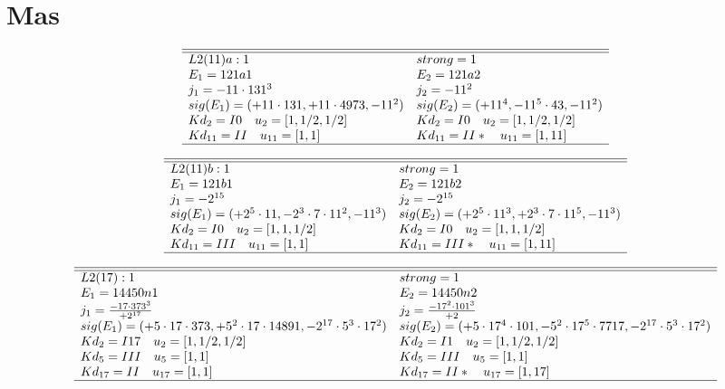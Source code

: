 \documentclass[11pt]{article}
\theoremstyle{definition}
\begin{document}
\newpage 

\section{Mas}
$$
 \begin{array}{ll}
 \hline 
\hline 
  L2(11)a:1  & strong=1\\
 E_1=121a1 & E_2=121a2 \\
 j_1=-11\cdot 131^{3} & j_2=-11^{2} \\
 sig(E_1)=(+11\cdot 131,+11\cdot 4973,-11^{2}) & sig(E_2)=(+11^{4},-11^{5}\cdot 43,-11^{2}) \\
  Kd_{2}=I0\quad u_{2}=[ 1, 1/2, 1/2 ]&  Kd_{2}=I0\quad u_{2}=[ 1, 1/2, 1/2 ]\\
  Kd_{11}=II\quad u_{11}=[ 1, 1 ]&  Kd_{11}=II*\quad u_{11}=[ 1, 11 ]\\
\hline
\end{array}
 $$


$$
 \begin{array}{ll}
 \hline 
\hline 
  L2(11)b:1  & strong=1\\
 E_1=121b1 & E_2=121b2 \\
 j_1=-2^{15} & j_2=-2^{15} \\
 sig(E_1)=(+2^{5}\cdot 11,-2^{3}\cdot 7\cdot 11^{2},-11^{3}) & sig(E_2)=(+2^{5}\cdot 11^{3},+2^{3}\cdot 7\cdot 11^{5},-11^{3}) \\
  Kd_{2}=I0\quad u_{2}=[ 1, 1, 1/2 ]&  Kd_{2}=I0\quad u_{2}=[ 1, 1, 1/2 ]\\
  Kd_{11}=III\quad u_{11}=[ 1, 1 ]&  Kd_{11}=III*\quad u_{11}=[ 1, 11 ]\\
\hline
\end{array}
 $$


$$
 \begin{array}{ll}
 \hline 
\hline 
  L2(17):1  & strong=1\\
 E_1=14450n1 & E_2=14450n2 \\
 j_1=\frac{-17\cdot 373^{3}}{+2^{17}} & j_2=\frac{-17^{2}\cdot 101^{3}}{+2} \\
 sig(E_1)=(+5\cdot 17\cdot 373,+5^{2}\cdot 17\cdot 14891,-2^{17}\cdot 5^{3}\cdot
17^{2}) & sig(E_2)=(+5\cdot 17^{4}\cdot 101,-5^{2}\cdot 17^{5}\cdot 7717,-2^{17}\cdot 
5^{3}\cdot 17^{2}) \\
  Kd_{2}=I17\quad u_{2}=[ 1, 1/2, 1/2 ]&  Kd_{2}=I1\quad u_{2}=[ 1, 1/2, 1/2 ]\\
  Kd_{5}=III\quad u_{5}=[ 1, 1 ]&  Kd_{5}=III\quad u_{5}=[ 1, 1 ]\\
  Kd_{17}=II\quad u_{17}=[ 1, 1 ]&  Kd_{17}=II*\quad u_{17}=[ 1, 17 ]\\
\hline
\end{array}
 $$
\end{document}
